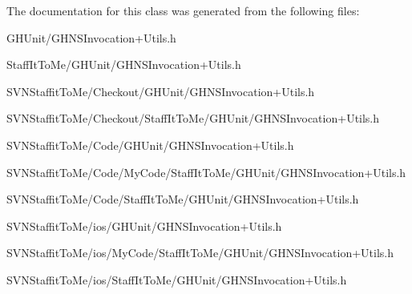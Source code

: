 \-The documentation for this class was generated from the following files\-:\begin{DoxyCompactItemize}
\item 
\-G\-H\-Unit/\-G\-H\-N\-S\-Invocation+\-Utils.\-h\item 
\-Staff\-It\-To\-Me/\-G\-H\-Unit/\-G\-H\-N\-S\-Invocation+\-Utils.\-h\item 
\-S\-V\-N\-Staffit\-To\-Me/\-Checkout/\-G\-H\-Unit/\-G\-H\-N\-S\-Invocation+\-Utils.\-h\item 
\-S\-V\-N\-Staffit\-To\-Me/\-Checkout/\-Staff\-It\-To\-Me/\-G\-H\-Unit/\-G\-H\-N\-S\-Invocation+\-Utils.\-h\item 
\-S\-V\-N\-Staffit\-To\-Me/\-Code/\-G\-H\-Unit/\-G\-H\-N\-S\-Invocation+\-Utils.\-h\item 
\-S\-V\-N\-Staffit\-To\-Me/\-Code/\-My\-Code/\-Staff\-It\-To\-Me/\-G\-H\-Unit/\-G\-H\-N\-S\-Invocation+\-Utils.\-h\item 
\-S\-V\-N\-Staffit\-To\-Me/\-Code/\-Staff\-It\-To\-Me/\-G\-H\-Unit/\-G\-H\-N\-S\-Invocation+\-Utils.\-h\item 
\-S\-V\-N\-Staffit\-To\-Me/ios/\-G\-H\-Unit/\-G\-H\-N\-S\-Invocation+\-Utils.\-h\item 
\-S\-V\-N\-Staffit\-To\-Me/ios/\-My\-Code/\-Staff\-It\-To\-Me/\-G\-H\-Unit/\-G\-H\-N\-S\-Invocation+\-Utils.\-h\item 
\-S\-V\-N\-Staffit\-To\-Me/ios/\-Staff\-It\-To\-Me/\-G\-H\-Unit/\-G\-H\-N\-S\-Invocation+\-Utils.\-h\end{DoxyCompactItemize}
